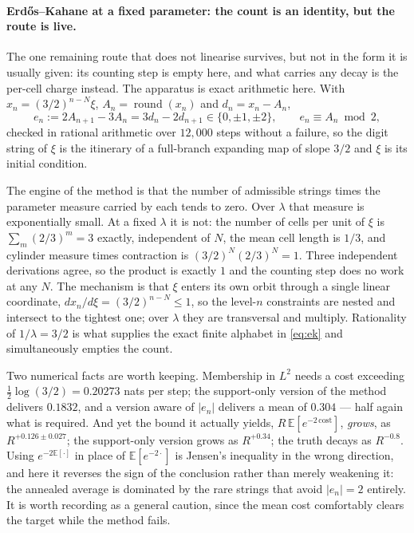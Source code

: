 \documentclass[11pt]{article}
\theoremstyle{remark}
\newcommand{\lam}{\lambda}
\begin{document}
\paragraph{Erd\H os--Kahane at a fixed parameter: the count is an identity, but the route is live.} The one remaining route
that does not linearise survives, but not in the form it is usually given: its counting step is empty here,
and what carries any decay is the per-cell charge instead. The apparatus is exact arithmetic here. With $x_n=(3/2)^{n-N}\xi$,
$A_n=\operatorname{round}(x_n)$ and $d_n=x_n-A_n$,
\begin{equation}\label{eq:ek}
  e_n:=2A_{n+1}-3A_n=3d_n-2d_{n+1}\in\{0,\pm1,\pm2\},\qquad e_n\equiv A_n\bmod 2,
\end{equation}
checked in rational arithmetic over $12{,}000$ steps without a failure, so the digit string of $\xi$ is
the itinerary of a full-branch expanding map of slope $3/2$ and $\xi$ is its initial condition.

The engine of the method is that the number of admissible strings times the parameter measure carried by
each tends to zero. Over $\lam$ that measure is exponentially small. At a fixed $\lam$ it is not: the
number of cells per unit of $\xi$ is $\sum_m(2/3)^m=3$ exactly, independent of $N$, the mean cell length
is $1/3$, and cylinder measure times contraction is $(3/2)^N(2/3)^N=1$. Three independent derivations
agree, so the product is exactly $1$ and the counting step does no work at any $N$. The mechanism is that
$\xi$ enters its own orbit through a single linear coordinate, $dx_n/d\xi=(3/2)^{n-N}\le1$, so the
level-$n$ constraints are nested and intersect to the tightest one; over $\lam$ they are transversal and
multiply. Rationality of $1/\lam=3/2$ is what supplies the exact finite alphabet in \eqref{eq:ek} and
simultaneously empties the count.

Two numerical facts are worth keeping. Membership in $L^2$ needs a cost exceeding
$\tfrac12\log(3/2)=0.20273$ nats per step; the support-only version of the method delivers $0.1832$, and
a version aware of $|e_n|$ delivers a mean of $0.304$ --- half again what is required. And yet the bound
it actually yields, $R\,\mathbb E[e^{-2\,\mathrm{cost}}]$, \emph{grows}, as $R^{+0.126\pm0.027}$; the
support-only version grows as $R^{+0.34}$; the truth decays as $R^{-0.8}$. Using $e^{-2\mathbb E[\cdot]}$
in place of $\mathbb E[e^{-2\cdot}]$ is Jensen's inequality in the wrong direction, and here it reverses
the sign of the conclusion rather than merely weakening it: the annealed average is dominated by the rare
strings that avoid $|e_n|=2$ entirely. It is worth recording as a general caution, since the mean cost
comfortably clears the target while the method fails.
\end{document}
